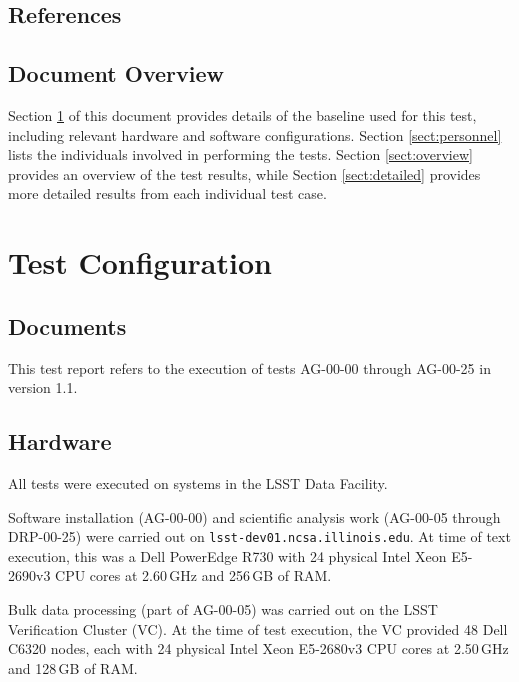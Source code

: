 \documentclass[DM,lsstdraft,STR,toc]{lsstdoc}
\begin{document}
\subsection{References}
\label{sect:references}

\renewcommand{\refname}{}


\subsection{Document Overview}
\label{sect:docoverview}

Section \ref{sect:configuration} of this document provides details of the \product{} baseline used for this test, including relevant hardware and software configurations.
Section \ref{sect:personnel} lists the individuals involved in performing the tests.
Section \ref{sect:overview} provides an overview of the test results, while Section \ref{sect:detailed} provides more detailed results from each individual test case.

\section{Test Configuration}
\label{sect:configuration}

\subsection{Documents}

This test report refers to the execution of tests AG-00-00 through AG-00-25 in  version 1.1.

\subsection{Hardware}
\label{sect:hwconf}

All tests were executed on systems in the LSST Data Facility.

Software installation (AG-00-00) and scientific analysis work (AG-00-05 through DRP-00-25) were carried out on \texttt{lsst-dev01.ncsa.illinois.edu}.
At time of text execution, this was a Dell PowerEdge R730 with 24 physical Intel Xeon E5-2690v3 CPU cores at 2.60\,GHz and 256\,GB of RAM.

Bulk data processing (part of AG-00-05) was carried out on the LSST Verification Cluster (VC).
At the time of test execution, the VC provided 48 Dell C6320 nodes, each with 24 physical Intel Xeon E5-2680v3 CPU cores at 2.50\,GHz and 128\,GB of RAM.
\end{document}
